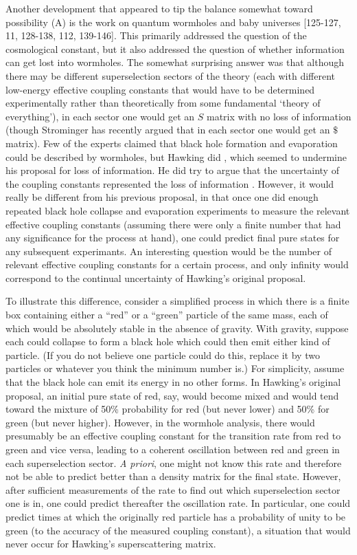      Another development that appeared to tip the balance somewhat
toward
possibility (A) is the work on quantum wormholes and baby universes
[125-127, 11, 128-138, 112, 139-146].
This primarily addressed the question of the cosmological constant,
but it also
addressed the question of whether information can get lost into
wormholes.  The
somewhat surprising answer was that although there may be different
superselection sectors of the theory (each with different low-energy
effective
coupling constants that would have to be determined experimentally
rather than
theoretically from some fundamental `theory of everything'), in each
sector one
would get an $S$ matrix with no loss of information (though
Strominger has
recently argued \cite{Strom93}
that in each sector one would get an $\$$ matrix).  Few of the
experts claimed
that black hole formation and evaporation could be described by
wormholes, but
Hawking did \cite{w6}, which seemed to undermine his proposal for
loss of
information.  He did try to argue that the uncertainty of the
coupling
constants represented the loss of information \cite{w10,w15}.
However, it
would
really be different from his previous proposal, in that once one did
enough
repeated black hole collapse and evaporation experiments to measure
the
relevant effective coupling constants (assuming there were only a
finite number
that had any significance for the process at hand), one could predict
final
pure states for any subsequent experimants.  An interesting question
would be
the number of relevant effective coupling constants for a certain
process, and
only infinity would correspond to the continual uncertainty of
Hawking's
original proposal.

     To illustrate this difference, consider a simplified process in
which
there is a finite box containing either a ``red'' or a ``green''
particle of
the
same mass, each of which would be absolutely stable in the absence of
gravity.
With gravity, suppose each could collapse to form a black hole which
could then
emit either kind of particle.  (If you do not believe one particle
could do
this, replace it by two particles or whatever you think the minimum
number is.)
For simplicity, assume that the black hole can emit its energy in no
other
forms.
In Hawking's original proposal, an initial  pure state of red, say,
would
become mixed and would tend toward the mixture of 50\% probability
for red (but
never lower) and 50\% for green (but never higher).  However, in the
wormhole
analysis, there would presumably be an effective coupling constant
for the
transition rate from red to green and vice versa, leading to a
coherent
oscillation between red and green in each superselection sector.
{\it A
priori}, one might not know this rate and therefore not be able to
predict
better than a density matrix for the final state.  However, after
sufficient
measurements of the rate to find out which superselection sector one
is in, one
could predict thereafter the oscillation rate.  In particular, one
could
predict times at which the originally red particle has a probability
of unity
to be green (to the accuracy of the measured coupling constant), a
situation
that would never occur for Hawking's superscattering matrix.

